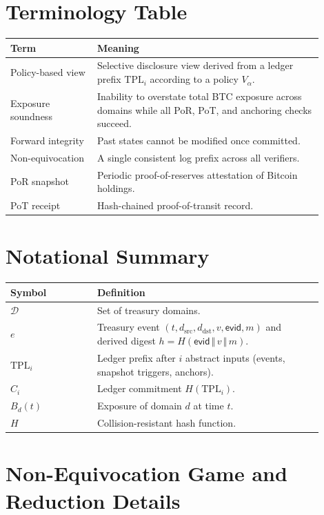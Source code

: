 \documentclass[11pt]{article}
\begin{document}
\section{Terminology Table}
\begin{tabular}{p{0.25\linewidth} p{0.65\linewidth}}
\textbf{Term} & \textbf{Meaning} \\
\hline
Policy-based view & Selective disclosure view derived from a ledger prefix $\mathrm{TPL}_i$ according to a policy $V_\alpha$. \\
Exposure soundness & Inability to overstate total BTC exposure across domains while all PoR, PoT, and anchoring checks succeed. \\
Forward integrity & Past states cannot be modified once committed. \\
Non-equivocation & A single consistent log prefix across all verifiers. \\
PoR snapshot & Periodic proof-of-reserves attestation of Bitcoin holdings. \\
PoT receipt & Hash-chained proof-of-transit record. \\
\end{tabular}

\section{Notational Summary}
\begin{tabular}{p{0.25\linewidth} p{0.65\linewidth}}
\textbf{Symbol} & \textbf{Definition} \\
\hline
$\mathcal{D}$ & Set of treasury domains. \\
$e$ & Treasury event $(t,d_{\mathrm{src}},d_{\mathrm{dst}},v,\mathsf{evid},m)$ and derived digest $h = H(\mathsf{evid} \,\Vert\, v \,\Vert\, m)$. \\
$\mathrm{TPL}_i$ & Ledger prefix after $i$ abstract inputs (events, snapshot triggers, anchors). \\
$C_i$ & Ledger commitment $H(\mathrm{TPL}_i)$. \\
$B_d(t)$ & Exposure of domain $d$ at time $t$. \\
$H$ & Collision-resistant hash function. \\
\end{tabular}

\section{Non-Equivocation Game and Reduction Details}
\end{document}
